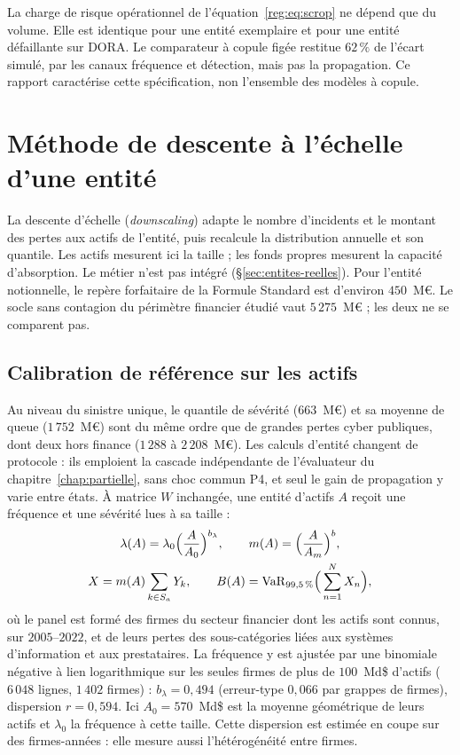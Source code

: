 La charge de risque opérationnel de l'équation~\eqref{reg:eq:scrop} ne dépend que du volume. Elle
est identique pour une entité exemplaire et pour une entité défaillante sur DORA. Le comparateur à
copule figée restitue $62\,\%$ de l'écart simulé, par les canaux fréquence et détection, mais pas
la propagation. Ce rapport caractérise cette spécification, non l'ensemble des modèles à copule.

\section{Méthode de descente à l'échelle d'une entité}
\label{sec:ancrage}

La descente d'échelle (\emph{downscaling}) adapte le nombre d'incidents et le montant des pertes aux actifs de l'entité, puis recalcule la distribution annuelle et son quantile. Les actifs mesurent ici la taille ;
les fonds propres mesurent la capacité d'absorption. Le métier n'est pas intégré (\S\ref{sec:entites-reelles}).
Pour l'entité notionnelle, le repère forfaitaire de la Formule Standard est d'environ $450$~M\euro. Le socle sans contagion du périmètre financier étudié vaut $5\,275$~M\euro{} ;
les deux ne se comparent pas.

\subsection{Calibration de référence sur les actifs}

Au niveau du
sinistre unique, le quantile de sévérité ($663$~M\euro) et sa moyenne de queue ($1\,752$~M\euro)
sont du même ordre que de grandes pertes cyber publiques, dont deux hors finance ($1\,288$ à $2\,208$~M\euro). Les calculs d'entité changent de protocole : ils emploient la
cascade indépendante de l'évaluateur du chapitre~\ref{chap:partielle}, sans choc commun P4, et
seul le gain de propagation y varie entre états. À matrice $W$ inchangée, une entité d'actifs $A$
reçoit une fréquence et une sévérité lues à sa taille :
\begin{equation}\label{eq:descente}
\begin{gathered}
\lambda(A)=\lambda_0\Big(\frac{A}{A_0}\Big)^{b_\lambda},\qquad
m(A)=\Big(\frac{A}{A_m}\Big)^{b},\\
X=m(A)\sum_{k\in S_a}Y_k,\qquad
B(A)=\mathrm{VaR}_{99{,}5\,\%}\Big(\sum_{n=1}^{N}X_n\Big),
\end{gathered}
\end{equation}
où le panel est formé des firmes du secteur financier dont les actifs sont connus, sur
$2005$--$2022$, et de leurs pertes des sous-catégories liées aux systèmes d'information et aux prestataires.
La fréquence y est ajustée par une binomiale négative à lien logarithmique sur les seules firmes de plus de
$100$~Md\$ d'actifs ($6\,048$ lignes, $1\,402$ firmes) : $b_\lambda=0{,}494$ (erreur-type $0{,}066$ par grappes de firmes),
dispersion $r=0{,}594$. Ici $A_0=570$~Md\$ est la moyenne géométrique de leurs actifs et $\lambda_0$ la fréquence à cette taille.
Cette dispersion est estimée en coupe sur des firmes-années : elle mesure aussi l'hétérogénéité entre firmes.

